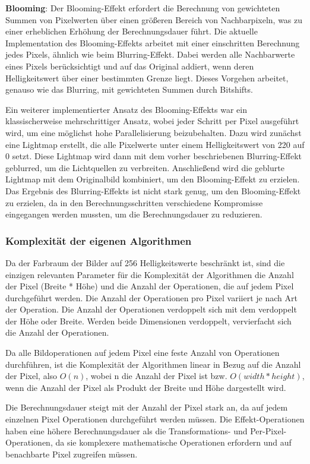 \textbf{Blooming}:
Der Blooming-Effekt erfordert die Berechnung von gewichteten Summen von Pixelwerten über einen größeren Bereich von Nachbarpixeln, was zu einer erheblichen Erhöhung der Berechnungsdauer führt. Die aktuelle Implementation des Blooming-Effekts arbeitet mit einer einschritten Berechnung jedes Pixels, ähnlich wie beim Blurring-Effekt. Dabei werden alle Nachbarwerte eines Pixels berücksichtigt und auf das Original addiert, wenn deren Helligkeitswert über einer bestimmten Grenze liegt. Dieses Vorgehen arbeitet, genauso wie das Blurring, mit gewichteten Summen durch Bitshifts.

Ein weiterer implementierter Ansatz des Blooming-Effekts war ein klassischerweise mehrschrittiger Ansatz, wobei jeder Schritt per Pixel ausgeführt wird, um eine möglichst hohe Parallelisierung beizubehalten. Dazu wird zunächst eine Lightmap erstellt, die alle Pixelwerte unter einem Helligkeitswert von 220 auf 0 setzt. Diese Lightmap wird dann mit dem vorher beschriebenen Blurring-Effekt geblurred, um die Lichtquellen zu verbreiten. Anschließend wird die geblurte Lightmap mit dem Originalbild kombiniert, um den Blooming-Effekt zu erzielen. Das Ergebnis des Blurring-Effekts ist nicht stark genug, um den Blooming-Effekt zu erzielen, da in den Berechnungsschritten verschiedene Kompromisse eingegangen werden mussten, um die Berechnungsdauer zu reduzieren. 

\subsubsection{Komplexität der eigenen Algorithmen}
Da der Farbraum der Bilder auf 256 Helligkeitswerte beschränkt ist, sind die einzigen relevanten Parameter für die Komplexität der Algorithmen die Anzahl der Pixel (Breite * Höhe) und die Anzahl der Operationen, die auf jedem Pixel durchgeführt werden. Die Anzahl der Operationen pro Pixel variiert je nach Art der Operation. Die Anzahl der Operationen verdoppelt sich mit dem verdoppelt der Höhe oder Breite. Werden beide Dimensionen verdoppelt, vervierfacht sich die Anzahl der Operationen.

Da alle Bildoperationen auf jedem Pixel eine feste Anzahl von Operationen durchführen, ist die Komplexität der Algorithmen linear in Bezug auf die Anzahl der Pixel, also $O(n)$, wobei n die Anzahl der Pixel ist bzw. $O(width * height)$, wenn die Anzahl der Pixel als Produkt der Breite und Höhe dargestellt wird.

Die Berechnungsdauer steigt mit der Anzahl der Pixel stark an, da auf jedem einzelnen Pixel Operationen durchgeführt werden müssen. Die Effekt-Operationen haben eine höhere Berechnungsdauer als die Transformations- und Per-Pixel-Operationen, da sie komplexere mathematische Operationen erfordern und auf benachbarte Pixel zugreifen müssen.

